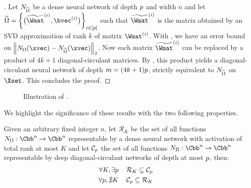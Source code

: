 \begin{proof}[]
  Let $N_{\widetilde{\Omega}}$ be a dense neural network of depth $p$ and width $n$ and let $\widetilde{\Omega} = \left\{ \big(\widetilde{\Wmat}^{(i)}, \bvec^{(i)} \big) \right\}_{i \in [\depth]}$ such that $\widetilde{\Wmat}^{(i)}$ is the matrix obtained by an SVD approximation of rank $k$ of matrix $\Wmat^{(i)}$.
  With , we have an error bound on $\norm{ \nn_\Omega (\xvec) - \nn_{\widetilde{\Omega}} (\xvec)}_2$.
  Now each matrix $\widetilde{\Wmat}^{(i)}$ can be replaced by a product of $4k+1$ diagonal-circulant matrices.
  By , this product yields a diagonal-circulant neural network of depth $m = (4k+1)p$, strictly equivalent to $N_{\widetilde{\Omega}}$ on $\Xset$.
  This concludes the proof.
\end{proof}

\pagebreak

\begin{figure}[htb]
    \begin{center}
      
    \end{center}
    \caption{Illustration of .}
    \label{figure:ch4-circfig}
\end{figure}

We highlight the significance of these results with the two following properties.
\begin{properties}
  Given an arbitrary fixed integer $n$, let $\mathcal{R}_{K}$ be the set of all functions $\nn_\Omega:\Cbb^n \rightarrow \Cbb^n$ representable by a dense neural network with \relu activation of total rank at most $K$ and let $\mathcal{C}_p$ the set of all functions $\nn_\Pi:\Cbb^n \rightarrow \Cbb^n$ representable by deep diagonal-circulant networks of depth at most $p$, then:
  \begin{align}
    \label{property:eq1} \forall K,\exists p \, &\quad \mathcal{R}_{K} \subsetneq \mathcal{C}_{p} \\
    \label{property:eq2} \forall p,\nexists K\, &\quad \mathcal{C}_{p} \subseteq \mathcal{R}_{K}
  \end{align}
  \removespace
\end{properties}

